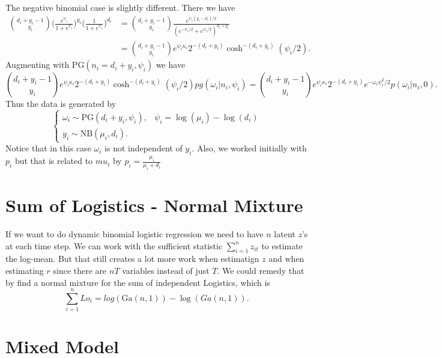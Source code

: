 \documentclass[]{article}
\newcommand{\PG}{\text{PG}}
\newcommand{\Ga}{\text{Ga}}
\newcommand{\NB}{\text{NB}}
\begin{document}
The negative binomial case is slightly different.  There we have
\begin{align*}
{d_i + y_i - 1 \choose y_i} \Big( \frac{e^{\psi_i}}{1 + e^{\psi_i}} \Big)^{y_i}
\Big( \frac{1}{1 + e^{\psi_i}} \Big)^{d_i}
& = 
{d_i + y_i - 1 \choose y_i} \frac{e^{\psi_i (y_i - d_i) /
    2}}{(e^{-\psi_i/2}+e^{\psi_i/2})^{d_i+y_i}} \\
& = {d_i + y_i - 1 \choose y_i} e^{\psi_i \kappa_i} 2^{-(d_i+y_i)}
\cosh^{-(d_i+y_i)}(\psi_i/2). 
\end{align*}
Augmenting with $\PG(n_i = d_i + y_i, \psi_i)$ we have
\[
 {d_i + y_i - 1 \choose y_i} e^{\psi_i \kappa_i} 2^{-(d_i+y_i)}
\cosh^{-(d_i+y_i)}(\psi_i/2) pg(\omega_i | n_i, \psi_i)
= {d_i + y_i - 1 \choose y_i} e^{\psi_i \kappa_i} 2^{-(d_i+y_i)} e^{-\omega_i
\psi_i^2 / 2} p(\omega_i | n_i, 0).
\]
Thus the data is generated by
\[
\begin{cases}
\omega_i \sim \PG(d_i+y_i, \psi_i), & \psi_i = \log(\mu_i) - \log(d_i) \\
y_i \sim \NB(\mu_i, d_i).
\end{cases}
\]
Notice that in this case $\omega_i$ is not independent of $y_i$.  Also, we
worked initially with $p_i$ but that is related to $mu_i$ by $p_i =
\frac{\mu_i}{\mu_i + d_i}$

\section{Sum of Logistics - Normal Mixture}

If we want to do dynamic binomial logistic regression we need to have $n$ latent
$z$'s at each time step.  We can work with the sufficient statistic
$\sum_{i=1}^n z_{it}$ to estimate the log-mean.  But that still creates a lot
more work when estimatign $z$ and when estimating $r$ since there are $nT$
variables instead of just $T$.  We could remedy that by find a normal mixture
for the sum of independent Logistics, which is
\[
\sum_{i=1}^n Lo_i = log(\Ga(n,1)) - \log(Ga(n,1)).
\]

\section{Mixed Model}
\end{document}
